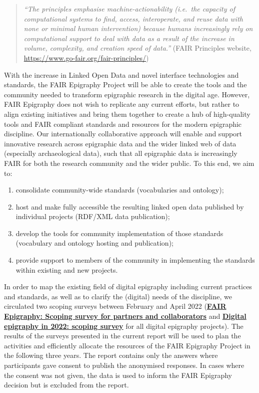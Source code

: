 \documentclass[
  12pt,
]{scrreprt}
\providecommand{\tightlist}{%
  \setlength{\itemsep}{0pt}\setlength{\parskip}{0pt}}
\begin{document}
\begin{quote}
\emph{``The principles emphasise machine-actionability (i.e.~the
capacity of computational systems to find, access, interoperate, and
reuse data with none or minimal human intervention) because humans
increasingly rely on computational support to deal with data as a result
of the increase in volume, complexity, and creation speed of data.''}
(FAIR Principles website,
\url{https://www.go-fair.org/fair-principles/})
\end{quote}

With the increase in Linked Open Data and novel interface technologies
and standards, the FAIR Epigraphy Project will be able to create the
tools and the community needed to transform epigraphic research in the
digital age. However, FAIR Epigraphy does not wish to replicate any
current efforts, but rather to align existing initiatives and bring them
together to create a hub of high-quality tools and FAIR compliant
standards and resources for the modern epigraphic discipline. Our
internationally collaborative approach will enable and support
innovative research across epigraphic data and the wider linked web of
data (especially archaeological data), such that all epigraphic data is
increasingly FAIR for both the research community and the wider public.
To this end, we aim to:

\begin{enumerate}
\def\labelenumi{\arabic{enumi}.}
\tightlist
\item
  consolidate community-wide standards (vocabularies and ontology);
\item
  host and make fully accessible the resulting linked open data
  published by individual projects (RDF/XML data publication);
\item
  develop the tools for community implementation of those standards
  (vocabulary and ontology hosting and publication);
\item
  provide support to members of the community in implementing the
  standards within existing and new projects.
\end{enumerate}

In order to map the existing field of digital epigraphy including
current practices and standards, as well as to clarify the (digital)
needs of the discipline, we circulated two scoping surveys between
February and April 2022
(\href{https://github.com/FAIR-epigraphy/scoping_survey_report/data/01_Survey_partners_questions.pdf}{\textbf{FAIR
Epigraphy: Scoping survey for partners and collaborators}} and
\href{https://github.com/FAIR-epigraphy/scoping_survey_report/data/02_Survey_projects_questions.pdf}{\textbf{Digital
epigraphy in 2022: scoping survey}} for all digital epigraphy projects).
The results of the surveys presented in the current report will be used
to plan the activities and efficiently allocate the resources of the
FAIR Epigraphy Project in the following three years. The report contains
only the answers where participants gave consent to publish the
anonymised responses. In cases where the consent was not given, the data
is used to inform the FAIR Epigraphy decision but is excluded from the
report.
\end{document}
